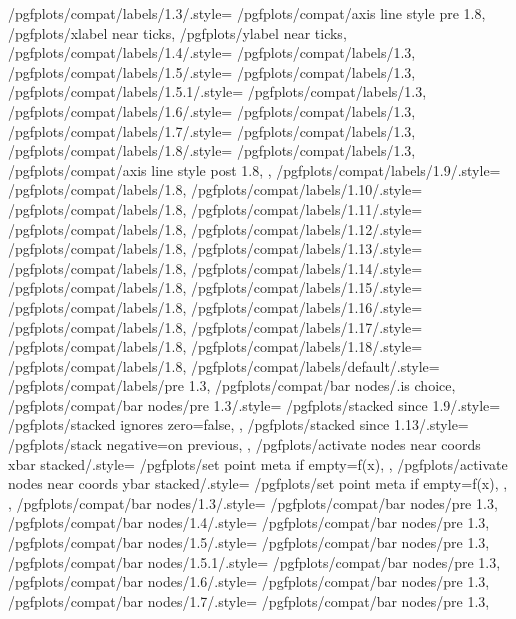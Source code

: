 {	/pgfplots/compat/labels/1.3/.style={%
		/pgfplots/compat/axis line style pre 1.8,
		/pgfplots/xlabel near ticks,
		/pgfplots/ylabel near ticks},%
	/pgfplots/compat/labels/1.4/.style=		{/pgfplots/compat/labels/1.3},%
	/pgfplots/compat/labels/1.5/.style=		{/pgfplots/compat/labels/1.3},%
	/pgfplots/compat/labels/1.5.1/.style=	{/pgfplots/compat/labels/1.3},%
	/pgfplots/compat/labels/1.6/.style=		{/pgfplots/compat/labels/1.3},%
	/pgfplots/compat/labels/1.7/.style=		{/pgfplots/compat/labels/1.3},%
	/pgfplots/compat/labels/1.8/.style=		{
		/pgfplots/compat/labels/1.3,
		/pgfplots/compat/axis line style post 1.8,
	},%
	/pgfplots/compat/labels/1.9/.style=		{/pgfplots/compat/labels/1.8},%
	/pgfplots/compat/labels/1.10/.style=		{/pgfplots/compat/labels/1.8},%
	/pgfplots/compat/labels/1.11/.style=		{/pgfplots/compat/labels/1.8},%
	/pgfplots/compat/labels/1.12/.style=		{/pgfplots/compat/labels/1.8},%
	/pgfplots/compat/labels/1.13/.style=		{/pgfplots/compat/labels/1.8},%
	/pgfplots/compat/labels/1.14/.style=		{/pgfplots/compat/labels/1.8},%
	/pgfplots/compat/labels/1.15/.style=		{/pgfplots/compat/labels/1.8},%
	/pgfplots/compat/labels/1.16/.style=		{/pgfplots/compat/labels/1.8},%
	/pgfplots/compat/labels/1.17/.style=		{/pgfplots/compat/labels/1.8},%
	/pgfplots/compat/labels/1.18/.style=		{/pgfplots/compat/labels/1.8},%
	/pgfplots/compat/labels/default/.style=	{/pgfplots/compat/labels/pre 1.3},%
	/pgfplots/compat/bar nodes/.is choice,
	/pgfplots/compat/bar nodes/pre 1.3/.style={%
		/pgfplots/stacked since 1.9/.style={
			/pgfplots/stacked ignores zero=false,%
		},%
		/pgfplots/stacked since 1.13/.style={
			/pgfplots/stack negative=on previous,%
		},%
		/pgfplots/activate nodes near coords xbar stacked/.style={%
			/pgfplots/set point meta if empty=f(x),%
		},%
		/pgfplots/activate nodes near coords ybar stacked/.style={%
			/pgfplots/set point meta if empty=f(x),%
		},%
	},%
	/pgfplots/compat/bar nodes/1.3/.style=		{/pgfplots/compat/bar nodes/pre 1.3},%
	/pgfplots/compat/bar nodes/1.4/.style=		{/pgfplots/compat/bar nodes/pre 1.3},%
	/pgfplots/compat/bar nodes/1.5/.style=		{/pgfplots/compat/bar nodes/pre 1.3},%
	/pgfplots/compat/bar nodes/1.5.1/.style=	{/pgfplots/compat/bar nodes/pre 1.3},%
	/pgfplots/compat/bar nodes/1.6/.style=		{/pgfplots/compat/bar nodes/pre 1.3},%
	/pgfplots/compat/bar nodes/1.7/.style=		{/pgfplots/compat/bar nodes/pre 1.3},%
}
